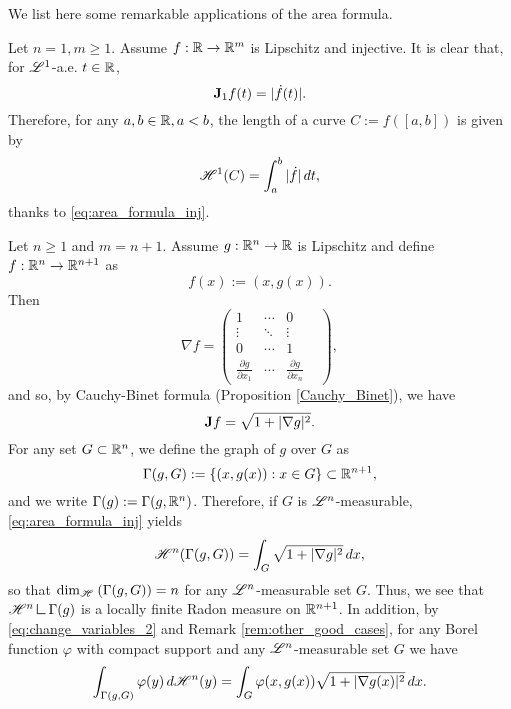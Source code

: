We list here some remarkable applications of the area formula.

\begin{example}
Let $n = 1, m \ge 1$. Assume $f : \mathbb{R} \to \mathbb{R}^{m}$ is Lipschitz and injective. It is clear that, for $\mathscr{L}^{1}$-a.e. $t \in \mathbb{R}$,
\begin{equation*}
{\bf J}_{1} f(t) = |\dot{f}(t)|. 
\end{equation*}
Therefore, for any $a, b \in \mathbb{R}, a < b$, the length of a curve $C := f([a, b])$ is given by
\begin{equation*}
\mathscr{H}^{1}(C) = \int_{a}^{b} |\dot{f}| \, dt,
\end{equation*}
thanks to \eqref{eq:area_formula_inj}.
\end{example}

\begin{example} \label{example:surface_area_graph}
Let $n \ge 1$ and $m = n + 1$. Assume $g: \mathbb{R}^{n} \to \mathbb{R}$ is Lipschitz and define $f: \mathbb{R}^{n} \to \mathbb{R}^{n + 1}$ as $$f(x) := (x, g(x)).$$
Then
\[\nabla f = \begin{pmatrix} 1 & \cdots & 0 & \\ \vdots & \ddots & \vdots \\ 
0 & \cdots & 1 & \\ \frac{\partial g}{\partial x_{1}} & \cdots & \frac{\partial g}{\partial x_{n}} & \end{pmatrix},\]
and so, by Cauchy-Binet formula (Proposition \ref{Cauchy_Binet}), we have
\begin{equation*}
{\bf J} f = \sqrt{1 + |\nabla g|^2}.
\end{equation*}
For any set $G \subset \mathbb{R}^{n}$, we define the graph of $g$ over $G$ as
$$ \Gamma(g, G) := \{ (x, g(x)) : x \in G \} \subset \mathbb{R}^{n + 1},$$
and we write $\Gamma(g) := \Gamma(g, \mathbb{R}^{n})$.
Therefore, if $G$ is $\mathscr{L}^{n}$-measurable, \eqref{eq:area_formula_inj} yields
\begin{equation*}
\mathscr{H}^{n}(\Gamma(g, G)) = \int_{G} \sqrt{1 + |\nabla g|^{2}} \, dx,
\end{equation*}
so that ${\rm dim}_{\mathscr{H}^{}}\left ( \Gamma(g, G)\right ) = n$ for any $\mathscr{L}^{n}$-measurable set $G$. Thus, we see that $\Haus{n} \res \Gamma(g)$ is a locally finite Radon measure on $\mathbb{R}^{n + 1}$. In addition, by \eqref{eq:change_variables_2} and Remark \ref{rem:other_good_cases}, for any Borel function $\varphi$ with compact support and any $\mathscr{L}^{n}$-measurable set $G$ we have
\begin{equation} \label{eq:area_formula_surface}
\int_{\Gamma(g, G)} \varphi(y) \, d \mathscr{H}^{n}(y) = \int_{G} \varphi(x, g(x)) \sqrt{1 + |\nabla g(x)|^{2}} \, d x.
\end{equation} 
\end{example}

